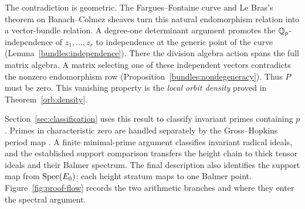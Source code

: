 The contradiction is geometric.  The Fargues--Fontaine curve
\cite{FF18} and Le Bras's theorem on Banach--Colmez sheaves
\cite{LeBras18} turn this natural endomorphism relation into a
vector-bundle relation.  A degree-one determinant argument promotes
the \(\mathbb Q_p\)-independence of \(z_1,\ldots,z_r\) to independence at the
generic point of the curve (Lemma~\ref{bundles:independence}).
There the division algebra action spans the full matrix algebra.
A matrix selecting one of these independent vectors contradicts the
nonzero endomorphism row
(Proposition~\ref{bundles:nondegeneracy}).  Thus \(P\) must be zero.
This vanishing property is the \emph{local orbit density} proved in
Theorem~\ref{orb:density}.

Section~\ref{sec:classification} uses this result to classify invariant
primes containing \(p\).  Primes in characteristic zero are handled
separately by the Gross--Hopkins period map \cite{GH94,HG94Bundles}.
A finite minimal-prime argument classifies invariant radical ideals,
and the established support comparison transfers the height chain to
thick tensor ideals and their Balmer spectrum.  The final description
also identifies the support map from \(\operatorname{Spec}(E_0)\): each height stratum
maps to one Balmer point.  Figure~\ref{fig:proof-flow} records the two
arithmetic branches and where they enter the spectral argument.
